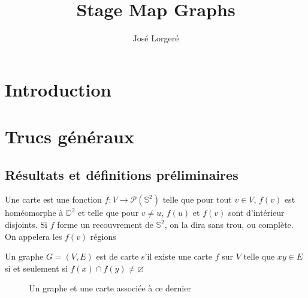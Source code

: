 \documentclass{scrartcl}
\begin{document}
\title{Stage Map Graphs}

\author{José Lorgeré}

\maketitle

\begin{flushleft}

\section*{Introduction}

\section{Trucs généraux}

\subsection{Résultats et définitions préliminaires}

\begin{def*}[Carte]
    Une carte est une fonction $f : V \rightarrow \mathcal{P}(\mathbb{S}^2)$ telle que pour tout $v \in V$, $f(v)$
    est homéomorphe à $\mathbb{D}^2$ et telle que pour $v \neq u$, $f(u)$ et $f(v)$ sont d'intérieur disjoints. Si
    $f$ forme un recouvrement de $\mathbb{S}^2$, on la dira sans trou, ou complète. On appelera les $f(v)$ régions
\end{def*}

\begin{def*}
    Un graphe $G = (V, E)$ est de carte s'il existe une carte $f$ sur $V$ telle que $xy \in E$ si et seulement si
    $f(x) \cap f(y) \neq \varnothing$
\end{def*}

\begin{figure}[h]
    \caption{Un graphe et une carte associée à ce dernier}

    \begin{center}
\end{center}
\end{figure}
\end{flushleft}
\end{document}
